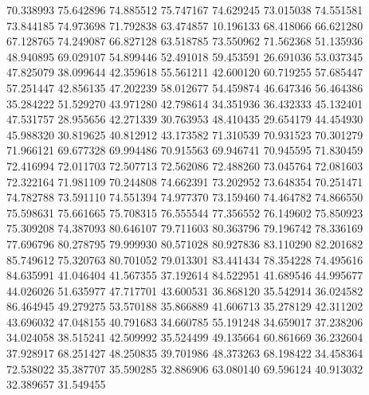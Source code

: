 70.338993
75.642896
74.885512
75.747167
74.629245
73.015038
74.551581
73.844185
74.973698
71.792838
63.474857
10.196133
68.418066
66.621280
67.128765
74.249087
66.827128
63.518785
73.550962
71.562368
51.135936
48.940895
69.029107
54.899446
52.491018
59.453591
26.691036
53.037345
47.825079
38.099644
42.359618
55.561211
42.600120
60.719255
57.685447
57.251447
42.856135
47.202239
58.012677
54.459874
46.647346
56.464386
35.284222
51.529270
43.971280
42.798614
34.351936
36.432333
45.132401
47.531757
28.955656
42.271339
30.763953
48.410435
29.654179
44.454930
45.988320
30.819625
40.812912
43.173582
71.310539
70.931523
70.301279
71.966121
69.677328
69.994486
70.915563
69.946741
70.945595
71.830459
72.416994
72.011703
72.507713
72.562086
72.488260
73.045764
72.081603
72.322164
71.981109
70.244808
74.662391
73.202952
73.648354
70.251471
74.782788
73.591110
74.551394
74.977370
73.159460
74.464782
74.866550
75.598631
75.661665
75.708315
76.555544
77.356552
76.149602
75.850923
75.309208
74.387093
80.646107
79.711603
80.363796
79.196742
78.336169
77.696796
80.278795
79.999930
80.571028
80.927836
83.110290
82.201682
85.749612
75.320763
80.701052
79.013301
83.441434
78.354228
74.495616
84.635991
41.046404
41.567355
37.192614
84.522951
41.689546
44.995677
44.026026
51.635977
47.717701
43.600531
36.868120
35.542914
36.024582
86.464945
49.279275
53.570188
35.866889
41.606713
35.278129
42.311202
43.696032
47.048155
40.791683
34.660785
55.191248
34.659017
37.238206
34.024058
38.515241
42.509992
35.524499
49.135664
60.861669
36.232604
37.928917
68.251427
48.250835
39.701986
48.373263
68.198422
34.458364
72.538022
35.387707
35.590285
32.886906
63.080140
69.596124
40.913032
32.389657
31.549455
